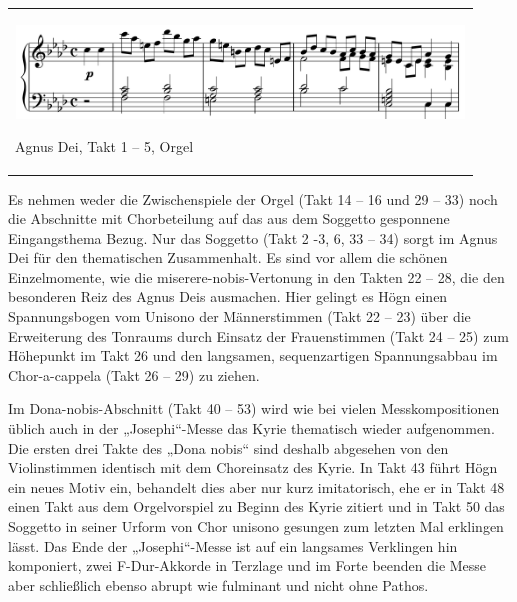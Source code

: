 \begin{center}
\tablefirsthead{}
\tablehead{}
\tabletail{}
\tablelasttail{}
\begin{supertabular}{m{12.107cm}}

\includegraphics[width=11.924cm,height=2.489cm]{pictures/zulassungsarbeit-img123.png}

Agnus Dei, Takt 1 – 5, Orgel\\
\end{supertabular}
\end{center}
Es nehmen weder die Zwischenspiele der Orgel (Takt 14 – 16 und 29 – 33)
noch die Abschnitte mit Chorbeteilung auf das aus dem Soggetto
gesponnene Eingangsthema Bezug. Nur das Soggetto (Takt 2 -3, 6, 33 –
34) sorgt im Agnus Dei für den thematischen Zusammenhalt. Es sind vor
allem die schönen Einzelmomente, wie die miserere-nobis-Vertonung in
den Takten 22 – 28, die den besonderen Reiz des Agnus Deis ausmachen.
Hier gelingt es Högn einen Spannungsbogen vom Unisono der Männerstimmen
(Takt 22 – 23) über die Erweiterung des Tonraums durch Einsatz der
Frauenstimmen (Takt 24 – 25) zum Höhepunkt im Takt 26 und den
langsamen, sequenzartigen Spannungsabbau im Chor-a-cappela (Takt 26 –
29) zu ziehen.

Im Dona-nobis-Abschnitt (Takt 40 – 53) wird wie bei vielen
Messkompositionen üblich auch in der „Josephi“-Messe das Kyrie
thematisch wieder aufgenommen. Die ersten drei Takte des „Dona nobis“
sind deshalb abgesehen von den Violinstimmen identisch mit dem
Choreinsatz des Kyrie. In Takt 43 führt Högn ein neues Motiv ein,
behandelt dies aber nur kurz imitatorisch, ehe er in Takt 48 einen Takt
aus dem Orgelvorspiel zu Beginn des Kyrie zitiert und in Takt 50 das
Soggetto in seiner Urform von Chor unisono gesungen zum letzten Mal
erklingen lässt. Das Ende der „Josephi“-Messe ist auf ein langsames
Verklingen hin komponiert, zwei F-Dur-Akkorde in Terzlage und im Forte
beenden die Messe aber schließlich ebenso abrupt wie fulminant und
nicht ohne Pathos.